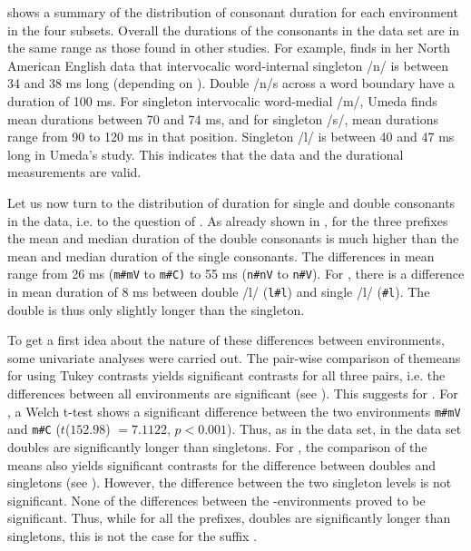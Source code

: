  shows a summary of the distribution of consonant duration for each environment in the four subsets. Overall the durations of the consonants in the data set are in the same range as those found in other studies. For example, \citet[Tables II and X]{Umeda.1977} finds in her North American English data that intervocalic word-internal singleton /n/ is between 34 and 38 ms long (depending on ). 
Double /n/s across a word boundary have a duration of 100 ms. For singleton intervocalic word-medial /m/, Umeda finds mean durations between 70 and 74 ms, and for singleton /s/, mean durations range from 90 to 120 ms in that position. Singleton /l/ is between 40 and 47 ms long in Umeda's study. This indicates that the data and the durational measurements are valid.

Let us now turn to the distribution of duration for single and double consonants in the data, i.e. to the question of .  As already shown in , for the three prefixes the mean and median duration of the double consonants is much higher than the mean and median duration of the single consonants. The differences in mean range from 26 ms (\texttt{m\#mV} to  \texttt{m\#C)} to 55 ms (\texttt{n\#nV} to  \texttt{n\#V}). For , there is a difference in mean duration of 8 ms between double /l/ (\texttt{l\#l}) and single /l/ (\texttt{\#l}). The double is thus only slightly longer than the singleton.
  
To get a first idea about the nature of these differences between environments, some univariate analyses were carried out. The pair-wise comparison of the\linebreak means for  using Tukey contrasts yields significant contrasts for all three pairs, i.e. the differences between all environments are significant (see ). This suggests  for . 
For , a Welch t-test shows a significant difference between the two environments \texttt{m\#mV} and \texttt{m\#C} ($t$($152.98$) $=7.1122$, $p< 0.001$). 
Thus, as in the data set, in the data set doubles are significantly longer than singletons.
For , the comparison of the means also yields significant contrasts for the difference between doubles and singletons (see ). However, the difference between the two singleton levels is not significant. None of the differences between the -environments proved to be significant. Thus, while for all the prefixes, doubles are significantly longer than singletons, this is not the case for the suffix .\pagebreak


